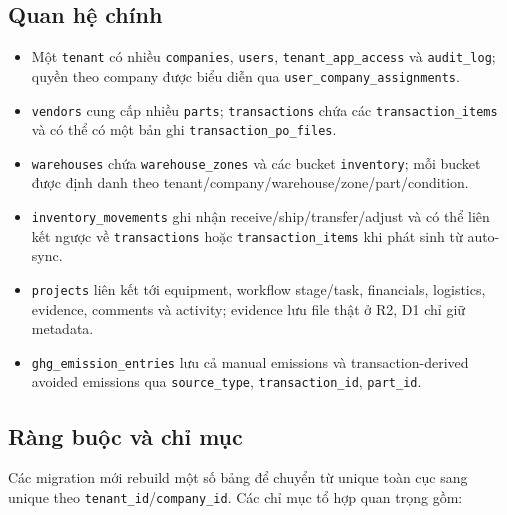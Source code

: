 \subsection{Quan hệ chính}
\begin{itemize}[leftmargin=1.2cm]
    \item Một \texttt{tenant} có nhiều \texttt{companies}, \texttt{users}, \texttt{tenant\_app\_access} và \texttt{audit\_log}; quyền theo company được biểu diễn qua \texttt{user\_company\_assignments}.
    \item \texttt{vendors} cung cấp nhiều \texttt{parts}; \texttt{transactions} chứa các \texttt{transaction\_items} và có thể có một bản ghi \texttt{transaction\_po\_files}.
    \item \texttt{warehouses} chứa \texttt{warehouse\_zones} và các bucket \texttt{inventory}; mỗi bucket được định danh theo tenant/company/warehouse/zone/part/condition.
    \item \texttt{inventory\_movements} ghi nhận receive/ship/transfer/adjust và có thể liên kết ngược về \texttt{transactions} hoặc \texttt{transaction\_items} khi phát sinh từ auto-sync.
    \item \texttt{projects} liên kết tới equipment, workflow stage/task, financials, logistics, evidence, comments và activity; evidence lưu file thật ở R2, D1 chỉ giữ metadata.
    \item \texttt{ghg\_emission\_entries} lưu cả manual emissions và transaction-derived avoided emissions qua \texttt{source\_type}, \texttt{transaction\_id}, \texttt{part\_id}.
\end{itemize}

\subsection{Ràng buộc và chỉ mục}
Các migration mới rebuild một số bảng để chuyển từ unique toàn cục sang unique theo \texttt{tenant\_id}/\texttt{company\_id}. Các chỉ mục tổ hợp quan trọng gồm:

